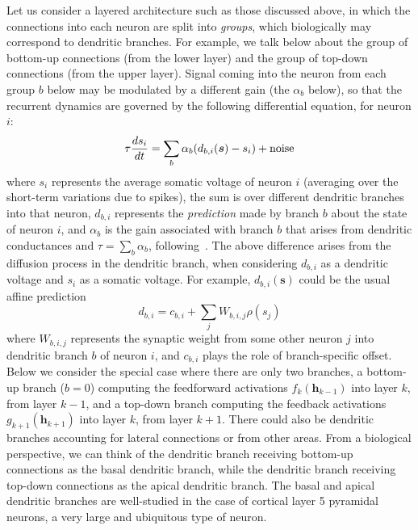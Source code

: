 \documentclass{article}
\newcommand   \vh{{\bm h}}
\newcommand   \vs{{\bm s}}
\begin{document}
Let us consider a layered architecture such as those discussed above,
in which the connections into each neuron are split into {\em groups},
which biologically may correspond to dendritic branches. For example,
we talk below about the group of bottom-up connections (from the lower layer)
and the group of top-down connections (from the upper layer). 
Signal coming into the neuron from each group $b$ below may be modulated by
a different gain (the $\alpha_b$ below), so that 
the recurrent dynamics are governed by the following differential
equation, for neuron $i$:
\begin{equation}
  \label{eq:multi-branch-update}
  \tau \frac{ds_i}{dt} = \sum_b \alpha_b (d_{b,i}(\vs) - s_i) + {\rm noise}
\end{equation}
where $s_i$ represents the average somatic voltage of neuron $i$ (averaging
over the short-term variations due to spikes),
the sum is over different dendritic branches into that neuron, 
$d_{b,i}$ represents the {\em prediction} made by branch $b$ about the
state of neuron $i$, and $\alpha_b$ is the gain associated
with branch $b$ that arises from dendritic conductances
and $\tau = \sum_b \alpha_b$, following~\citet{Urbanczik+Senn-2014}.
The above difference arises from the diffusion process in the dendritic branch,
when considering $d_{b,i}$ as a dendritic voltage and $s_i$ as a somatic voltage.
For example, $d_{b,i}(\vs)$ could be the usual affine prediction
\begin{equation}
  \label{eq:affine-branch}
   d_{b,i} = c_{b,i} + \sum_j W_{b,i,j} \rho(s_j)
\end{equation}
where $W_{b,i,j}$ represents the synaptic weight from some other neuron $j$ into dendritic
branch $b$ of neuron $i$, and $c_{b,i}$ plays the role of branch-specific offset.
Below we consider the special case where there
are only two branches, a bottom-up branch ($b=0$) computing the feedforward activations
$f_k(\vh_{k-1})$ into layer $k$, from layer $k-1$, and a top-down branch computing the
feedback activations $g_{k+1}(\vh_{k+1})$ into layer $k$, from layer $k+1$. There
could also be dendritic branches accounting for lateral connections or from other areas.
From a biological perspective, we can think of the dendritic branch receiving bottom-up connections
as the basal dendritic branch, while the dendritic branch receiving top-down connections
as the apical dendritic branch.
The basal and apical dendritic branches are well-studied in the case of cortical layer 5
pyramidal neurons, a very large and ubiquitous type of neuron.
\end{document}
